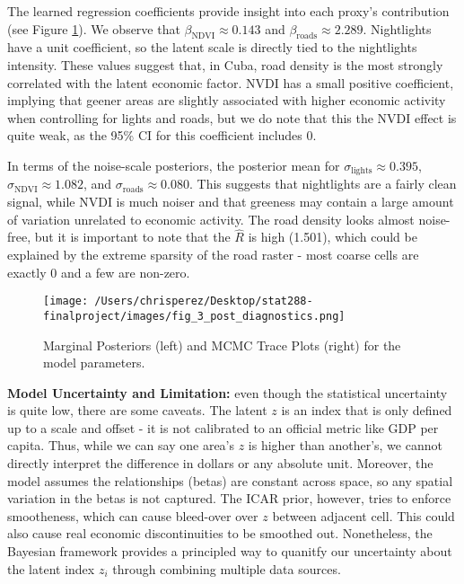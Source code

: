 \documentclass[12pt]{article}
\begin{document}
The learned regression coefficients provide insight into each proxy's contribution (see Figure \ref{fig:marginal_posterior_plot}). We observe that $\beta_{\text{NDVI}} \approx 0.143$ and $\beta_{\text{roads}} \approx 2.289$. Nightlights have a unit coefficient, so the latent scale is directly tied to the nightlights intensity. These values suggest that, in Cuba, road density is the most strongly correlated with the latent economic factor. NVDI has a small positive coefficient, implying that geener areas are slightly associated with higher economic activity when controlling for lights and roads, but we do note that this the NVDI effect is quite weak, as the 95\% CI for this coefficient includes 0.

In terms of the noise-scale posteriors, the posterior mean for $\sigma_{\text{lights}} \approx 0.395$, $\sigma_{\text{NDVI}} \approx 1.082$, and $\sigma_{\text{roads}} \approx 0.080$. This suggests that nightlights are a fairly clean signal, while NVDI is much noiser and that greeness may contain a large amount of variation unrelated to economic activity. The road density looks almost noise-free, but it is important to note that the $\hat R$ is high (1.501), which could be explained by the extreme sparsity of the road raster - most coarse cells are exactly 0 and a few are non-zero.

\begin{figure}[H]
  \centering
  \texttt{[image: /Users/chrisperez/Desktop/stat288-finalproject/images/fig\_3\_post\_diagnostics.png]}
  \caption{Marginal Posteriors (left) and MCMC Trace Plots (right) for the model parameters.}
  \label{fig:marginal_posterior_plot} 
\end{figure}





\textbf{Model Uncertainty and Limitation:} even though the statistical uncertainty is quite low, there are some caveats. The latent $z$ is an index that is only defined up to a scale and offset - it is not calibrated to an official metric like GDP per capita. Thus, while we can say one area's $z$ is higher than another's, we cannot directly interpret the difference in dollars or any absolute unit. Moreover, the model assumes the relationships (betas) are constant across space, so any spatial variation in the betas is not captured. The ICAR prior, however, tries to enforce smootheness, which can cause bleed-over over $z$ between adjacent cell. This could also cause real economic discontinuities to be smoothed out. Nonetheless, the Bayesian framework provides a principled way to quanitfy our uncertainty about the latent index $z_i$ through combining multiple data sources.
\end{document}
